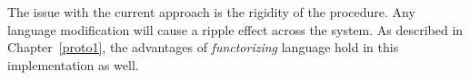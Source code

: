 \documentclass[thesis-solanki.tex]{subfiles}
\begin{document}
The issue with the current approach is the rigidity of the procedure.
Any language modification will cause a ripple effect across the system.
As described in Chapter~\ref{proto1}, the advantages of \textit{functorizing} language hold in this implementation
as well.

\end{document}
